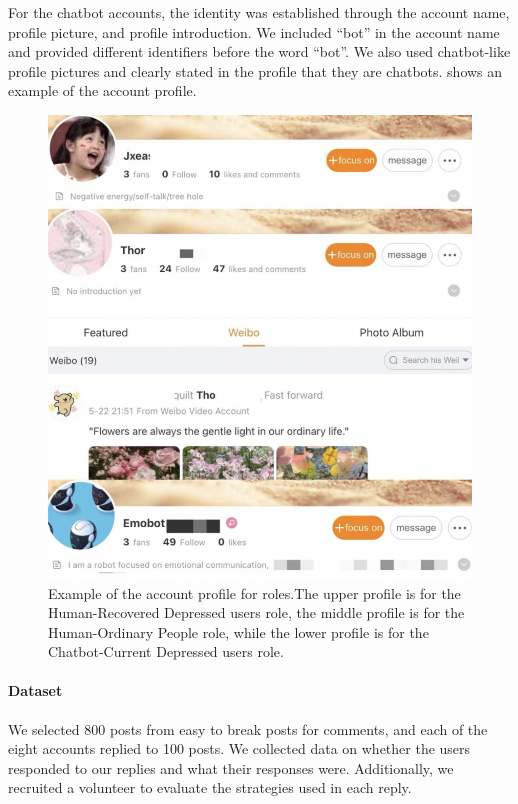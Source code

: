 For the chatbot accounts, the identity was established through the account name, profile picture, and profile introduction. We included ``bot'' in the account name and provided different identifiers before the word ``bot''. We also used chatbot-like profile pictures and clearly stated in the profile that they are chatbots.  shows an example of the account profile.
\begin{figure}[th]
    \centering
    \includegraphics[width=1\columnwidth]{images/roleplay3.png}
    \caption{Example of the account profile for roles.The upper profile is for the Human-Recovered Depressed users role, the middle profile is for the Human-Ordinary People role, while the lower profile is for the Chatbot-Current Depressed users role.}
    \label{fig:roleplay}
\end{figure}

\paragraph{Dataset}We selected 800 posts from easy to break posts for comments, and each of the eight accounts replied to 100 posts. We collected data on whether the users responded to our replies and what their responses were. Additionally, we recruited a volunteer to evaluate the strategies used in each reply. 

